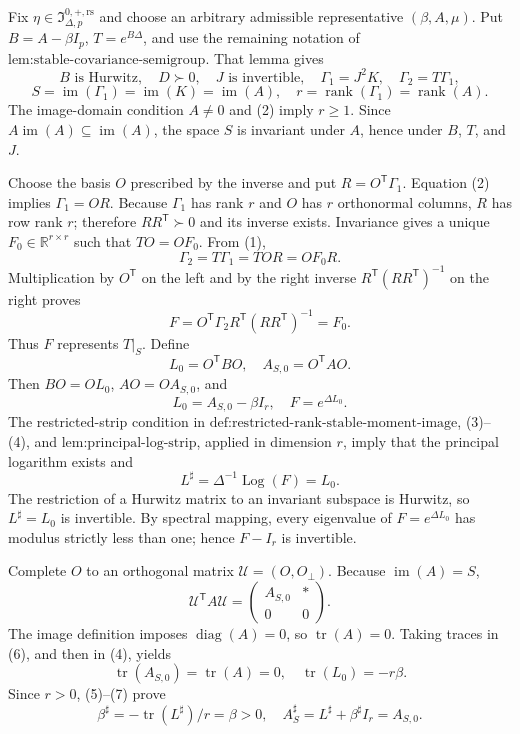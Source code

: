 Fix \(\eta\in\mathfrak I_{\Delta,p}^{0,+,\mathrm{rs}}\) and choose an arbitrary admissible representative \((\beta,A,\mu)\).  Put \(B=A-\beta I_p\), \(T=e^{B\Delta}\), and use the remaining notation of \(\text{lem:stable-covariance-semigroup}\).  That lemma gives
\[
 B\text{ is Hurwitz},\quad D\succ0,\quad J\text{ is invertible},
 \quad \Gamma_1=J^2K,\quad \Gamma_2=T\Gamma_1,
\tag{1}
\]
\[
 S=\operatorname{im}(\Gamma_1)=\operatorname{im}(K)=\operatorname{im}(A),
 \quad r=\operatorname{rank}(\Gamma_1)=\operatorname{rank}(A).
\tag{2}
\]
The image-domain condition \(A\neq0\) and (2) imply \(r\geq1\).  Since \(A\operatorname{im}(A)\subseteq\operatorname{im}(A)\), the space \(S\) is invariant under \(A\), hence under \(B\), \(T\), and \(J\).

Choose the basis \(O\) prescribed by the inverse and put \(R=O^{\mathsf T}\Gamma_1\).  Equation (2) implies \(\Gamma_1=OR\).  Because \(\Gamma_1\) has rank \(r\) and \(O\) has \(r\) orthonormal columns, \(R\) has row rank \(r\); therefore \(RR^{\mathsf T}\succ0\) and its inverse exists.  Invariance gives a unique \(F_0\in\mathbb R^{r\times r}\) such that \(TO=OF_0\).  From (1),
\[
 \Gamma_2=T\Gamma_1=TO R=OF_0R.
\]
Multiplication by \(O^{\mathsf T}\) on the left and by the right inverse \(R^{\mathsf T}(RR^{\mathsf T})^{-1}\) on the right proves
\[
 F=O^{\mathsf T}\Gamma_2R^{\mathsf T}(RR^{\mathsf T})^{-1}=F_0.
\tag{3}
\]
Thus \(F\) represents \(T|_S\).  Define
\[
 L_0=O^{\mathsf T}BO,\quad A_{S,0}=O^{\mathsf T}AO.
\]
Then \(BO=OL_0\), \(AO=OA_{S,0}\), and
\[
 L_0=A_{S,0}-\beta I_r,\quad F=e^{\Delta L_0}.
\tag{4}
\]
The restricted-strip condition in \(\text{def:restricted-rank-stable-moment-image}\), (3)--(4), and \(\text{lem:principal-log-strip}\), applied in dimension \(r\), imply that the principal logarithm exists and
\[
 L^\sharp=\Delta^{-1}\operatorname{Log}(F)=L_0.
\tag{5}
\]
The restriction of a Hurwitz matrix to an invariant subspace is Hurwitz, so \(L^\sharp=L_0\) is invertible.  By spectral mapping, every eigenvalue of \(F=e^{\Delta L_0}\) has modulus strictly less than one; hence \(F-I_r\) is invertible.

Complete \(O\) to an orthogonal matrix \(\mathcal U=(O,O_\perp)\).  Because \(\operatorname{im}(A)=S\),
\[
 \mathcal U^{\mathsf T}A\mathcal U
 =\begin{pmatrix}A_{S,0}&*\\0&0\end{pmatrix}.
\tag{6}
\]
The image definition imposes \(\operatorname{diag}(A)=0\), so \(\operatorname{tr}(A)=0\).  Taking traces in (6), and then in (4), yields
\[
 \operatorname{tr}(A_{S,0})=\operatorname{tr}(A)=0,
 \quad \operatorname{tr}(L_0)=-r\beta.
\tag{7}
\]
Since \(r>0\), (5)--(7) prove
\[
 \beta^\sharp=-\operatorname{tr}(L^\sharp)/r=\beta>0,
 \quad A_S^\sharp=L^\sharp+\beta^\sharp I_r=A_{S,0}.
\tag{8}
\]

